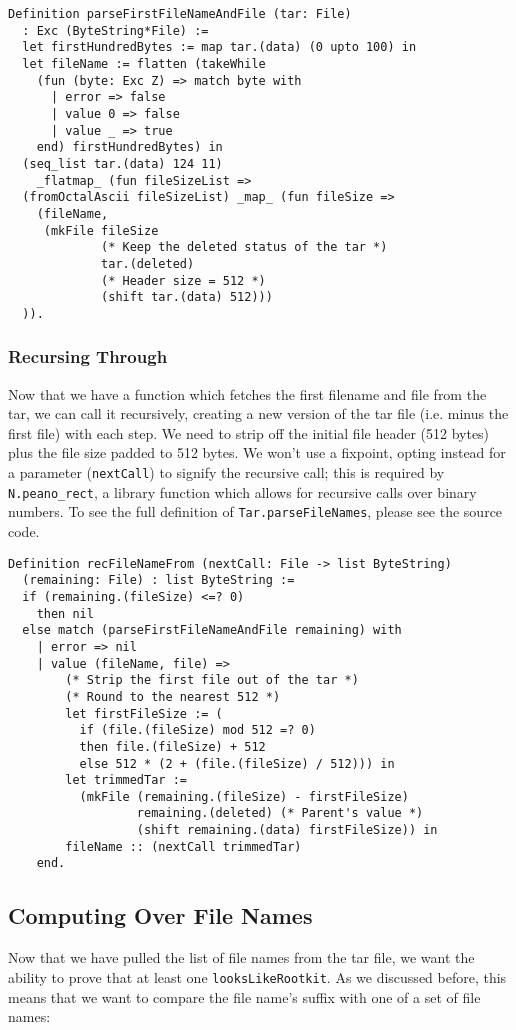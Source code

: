 \documentclass[nocopyrightspace]{sigplanconf}
\begin{document}
\begin{lstlisting}
Definition parseFirstFileNameAndFile (tar: File)
  : Exc (ByteString*File) :=
  let firstHundredBytes := map tar.(data) (0 upto 100) in
  let fileName := flatten (takeWhile 
    (fun (byte: Exc Z) => match byte with
      | error => false
      | value 0 => false
      | value _ => true
    end) firstHundredBytes) in
  (seq_list tar.(data) 124 11) 
    _flatmap_ (fun fileSizeList =>
  (fromOctalAscii fileSizeList) _map_ (fun fileSize =>
    (fileName, 
     (mkFile fileSize
             (* Keep the deleted status of the tar *)
             tar.(deleted)  
             (* Header size = 512 *)
             (shift tar.(data) 512)))
  )).
\end{lstlisting}

\subsubsection{Recursing Through}
Now that we have a function which fetches the first filename and file from the
tar, we can call it recursively, creating a new version of the tar file (i.e.
minus the first file) with each step. We need to strip off the initial file
header (512 bytes) plus the file size padded to 512 bytes. We won't use a
fixpoint, opting instead for a parameter ({\tt nextCall}) to signify the
recursive call; this is required by {\tt N.peano\_rect}, a library function
which allows for recursive calls over binary numbers. To see the full
definition of {\tt Tar.parseFileNames}, please see the source code.

\begin{lstlisting}
Definition recFileNameFrom (nextCall: File -> list ByteString) 
  (remaining: File) : list ByteString :=
  if (remaining.(fileSize) <=? 0)
    then nil
  else match (parseFirstFileNameAndFile remaining) with
    | error => nil
    | value (fileName, file) =>
        (* Strip the first file out of the tar *)
        (* Round to the nearest 512 *)
        let firstFileSize := (
          if (file.(fileSize) mod 512 =? 0)
          then file.(fileSize) + 512
          else 512 * (2 + (file.(fileSize) / 512))) in
        let trimmedTar := 
          (mkFile (remaining.(fileSize) - firstFileSize)
                  remaining.(deleted) (* Parent's value *)
                  (shift remaining.(data) firstFileSize)) in
        fileName :: (nextCall trimmedTar)
    end.
\end{lstlisting}

\subsection{Computing Over File Names}
Now that we have pulled the list of file names from the tar file, we want the
ability to prove that at least one {\tt looksLikeRootkit}. As we discussed
before, this means that we want to compare the file name's suffix with one of
a set of file names:
\end{document}
